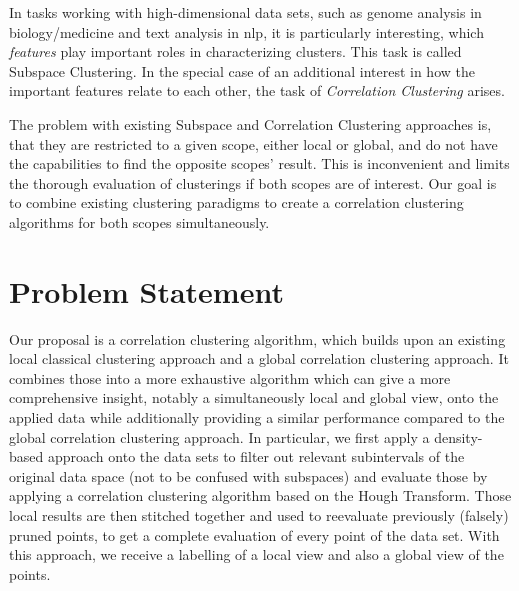 In tasks working with high-dimensional data sets, such as genome analysis in biology/medicine and text analysis in \gls{nlp}, it is particularly interesting, which \textit{features} play important roles in characterizing clusters. This task is called Subspace Clustering. In the special case of an additional interest in how the important features relate to each other, the task of \textit{Correlation Clustering} arises.

The problem with existing Subspace and Correlation Clustering approaches is, that they are restricted to a given scope, either local or global, and do not have the capabilities to find the opposite scopes' result. This is inconvenient and limits the thorough evaluation of clusterings if both scopes are of interest. Our goal is to combine existing clustering paradigms to create a correlation clustering algorithms for both scopes simultaneously.





\section{Problem Statement}
Our proposal is a correlation clustering algorithm, which builds upon an existing local classical clustering approach and a global correlation clustering approach. It combines those into a more exhaustive algorithm which can give a more comprehensive insight, notably a simultaneously local and global view, onto the applied data while additionally providing a similar performance compared to the global correlation clustering approach. In particular, we first apply a density-based approach onto the data sets to filter out relevant subintervals of the original data space (not to be confused with subspaces) and evaluate those by applying a correlation clustering algorithm based on the Hough Transform. Those local results are then stitched together and used to reevaluate previously (falsely) pruned points, to get a complete evaluation of every point of the data set. With this approach, we receive a labelling of a local view and also a global view of the points. 


